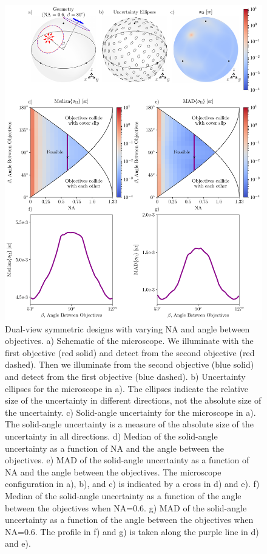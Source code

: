 \documentclass[10pt]{article}
\begin{document}
\begin{figure}[htbp]
\centering\includegraphics[width=\textwidth]{symmetric-widefield}
\caption{Dual-view symmetric designs with varying NA and angle between
  objectives. a) Schematic of the microscope. We illuminate with the first
  objective (red solid) and detect from the second objective (red dashed). Then
  we illuminate from the second objective (blue solid) and detect from the first
  objective (blue dashed). b) Uncertainty ellipses for the microscope in a). The
  ellipses indicate the relative size of the uncertainty in different
  directions, not the absolute size of the uncertainty. c) Solid-angle
  uncertainty for the microscope in a). The solid-angle uncertainty is a measure
  of the absolute size of the uncertainty in all directions. d) Median of the
  solid-angle uncertainty as a function of NA and the angle between the
  objectives. e) MAD of the solid-angle uncertainty as a function of NA and the
  angle between the objectives. The microscope configuration in a), b), and c)
  is indicated by a cross in d) and e). f) Median of the solid-angle uncertainty
  as a function of the angle between the objectives when NA=0.6. g) MAD of the
  solid-angle uncertainty as a function of the angle between the objectives when
  NA=0.6. The profile in f) and g) is taken along the purple line in d) and e).}
\label{fig:symmetric-widefield}
\end{figure}
\end{document}
